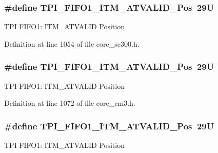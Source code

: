 \subsubsection[{\texorpdfstring{T\+P\+I\+\_\+\+F\+I\+F\+O1\+\_\+\+I\+T\+M\+\_\+\+A\+T\+V\+A\+L\+I\+D\+\_\+\+Pos}{TPI_FIFO1_ITM_ATVALID_Pos}}]{\setlength{\rightskip}{0pt plus 5cm}\#define T\+P\+I\+\_\+\+F\+I\+F\+O1\+\_\+\+I\+T\+M\+\_\+\+A\+T\+V\+A\+L\+I\+D\+\_\+\+Pos~29U}\hypertarget{group___c_m_s_i_s___t_p_i_ga08edfc862b2c8c415854cc4ae2067dfb}{}\label{group___c_m_s_i_s___t_p_i_ga08edfc862b2c8c415854cc4ae2067dfb}
T\+PI F\+I\+F\+O1\+: I\+T\+M\+\_\+\+A\+T\+V\+A\+L\+ID Position 

Definition at line 1054 of file core\+\_\+sc300.\+h.

\subsubsection[{\texorpdfstring{T\+P\+I\+\_\+\+F\+I\+F\+O1\+\_\+\+I\+T\+M\+\_\+\+A\+T\+V\+A\+L\+I\+D\+\_\+\+Pos}{TPI_FIFO1_ITM_ATVALID_Pos}}]{\setlength{\rightskip}{0pt plus 5cm}\#define T\+P\+I\+\_\+\+F\+I\+F\+O1\+\_\+\+I\+T\+M\+\_\+\+A\+T\+V\+A\+L\+I\+D\+\_\+\+Pos~29U}\hypertarget{group___c_m_s_i_s___t_p_i_ga08edfc862b2c8c415854cc4ae2067dfb}{}\label{group___c_m_s_i_s___t_p_i_ga08edfc862b2c8c415854cc4ae2067dfb}
T\+PI F\+I\+F\+O1\+: I\+T\+M\+\_\+\+A\+T\+V\+A\+L\+ID Position 

Definition at line 1072 of file core\+\_\+cm3.\+h.

\subsubsection[{\texorpdfstring{T\+P\+I\+\_\+\+F\+I\+F\+O1\+\_\+\+I\+T\+M\+\_\+\+A\+T\+V\+A\+L\+I\+D\+\_\+\+Pos}{TPI_FIFO1_ITM_ATVALID_Pos}}]{\setlength{\rightskip}{0pt plus 5cm}\#define T\+P\+I\+\_\+\+F\+I\+F\+O1\+\_\+\+I\+T\+M\+\_\+\+A\+T\+V\+A\+L\+I\+D\+\_\+\+Pos~29U}\hypertarget{group___c_m_s_i_s___t_p_i_ga08edfc862b2c8c415854cc4ae2067dfb}{}\label{group___c_m_s_i_s___t_p_i_ga08edfc862b2c8c415854cc4ae2067dfb}
T\+PI F\+I\+F\+O1\+: I\+T\+M\+\_\+\+A\+T\+V\+A\+L\+ID Position 

